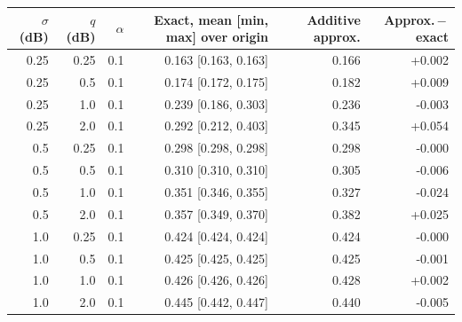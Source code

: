 \begin{tabular}{rrrrrr}
\toprule
$\sigma$ (dB) & $q$ (dB) & $\alpha$ & Exact, mean [min, max] over origin & Additive approx. & Approx.\,$-$\,exact \\
\midrule
0.25 & 0.25 & 0.1 & 0.163 [0.163, 0.163] & 0.166 & +0.002 \\
0.25 & 0.5 & 0.1 & 0.174 [0.172, 0.175] & 0.182 & +0.009 \\
0.25 & 1.0 & 0.1 & 0.239 [0.186, 0.303] & 0.236 & -0.003 \\
0.25 & 2.0 & 0.1 & 0.292 [0.212, 0.403] & 0.345 & +0.054 \\
0.5 & 0.25 & 0.1 & 0.298 [0.298, 0.298] & 0.298 & -0.000 \\
0.5 & 0.5 & 0.1 & 0.310 [0.310, 0.310] & 0.305 & -0.006 \\
0.5 & 1.0 & 0.1 & 0.351 [0.346, 0.355] & 0.327 & -0.024 \\
0.5 & 2.0 & 0.1 & 0.357 [0.349, 0.370] & 0.382 & +0.025 \\
1.0 & 0.25 & 0.1 & 0.424 [0.424, 0.424] & 0.424 & -0.000 \\
1.0 & 0.5 & 0.1 & 0.425 [0.425, 0.425] & 0.425 & -0.001 \\
1.0 & 1.0 & 0.1 & 0.426 [0.426, 0.426] & 0.428 & +0.002 \\
1.0 & 2.0 & 0.1 & 0.445 [0.442, 0.447] & 0.440 & -0.005 \\
\bottomrule
\end{tabular}